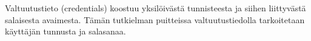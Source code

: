 Valtuutustieto (credentials) koostuu yksilöivästä tunnisteesta ja siihen liittyvästä salaisesta avaimesta. Tämän tutkielman puitteissa valtuutustiedolla tarkoitetaan käyttäjän tunnusta ja salasanaa.